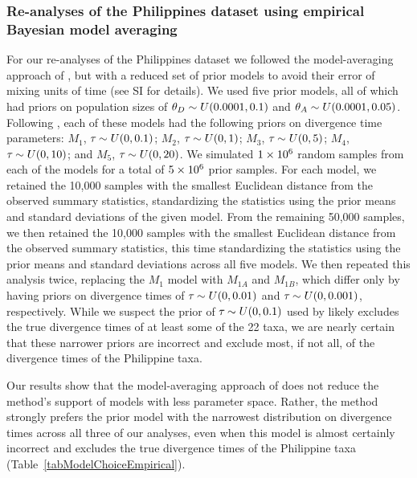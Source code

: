 \subsubsection*{Re-analyses of the Philippines dataset using empirical Bayesian
model averaging}

For our re-analyses of the Philippines dataset we followed the model-averaging
approach of \citet{Hickerson2013}, but with a reduced set of prior models to
avoid their error of mixing units of time (see SI for details).
We used five prior models, all of which had priors on population sizes of
$\meanDescendantTheta{} \sim U(0.0001, 0.1)$ and $\ancestralTheta{} \sim
U(0.0001, 0.05)$.
Following \citet{Hickerson2013}, each of these models had the following
priors on divergence time parameters:
$M_1$, $\tau_{} \sim U(0, 0.1)$;
$M_2$, $\tau_{} \sim U(0, 1)$;
$M_3$, $\tau_{} \sim U(0, 5)$;
$M_4$, $\tau_{} \sim U(0, 10)$; and
$M_5$, $\tau_{} \sim U(0, 20)$.
We simulated $1\times 10^{6}$ random samples from each of the models for a total of
$5\times 10^{6}$ prior samples.
For each model, we retained the 10,000 samples with the smallest Euclidean
distance from the observed summary statistics, standardizing the statistics
using the prior means and standard deviations of the given model.
From the remaining 50,000 samples, we then retained the 10,000 samples with the
smallest Euclidean distance from the observed summary statistics, this time
standardizing the statistics using the prior means and standard deviations
across all five models.
We then repeated this analysis twice, replacing the $M_1$ model with
$M_{1A}$ and $M_{1B}$, which differ only by having priors on divergence
times of $\tau_{} \sim U(0, 0.01)$ and $\tau_{} \sim U(0, 0.001)$,
respectively.
While we suspect the prior of $\tau_{} \sim U(0, 0.1)$ used by
\citet{Hickerson2013} likely excludes the true divergence times of at least
some of the 22 taxa, we are nearly certain that these narrower priors are
incorrect and exclude most, if not all, of the divergence times of the
Philippine taxa.

Our results show that the model-averaging approach of \citet{Hickerson2013}
does not reduce the method's support of models with less parameter space.
Rather, the method strongly prefers the prior model with the narrowest
distribution on divergence times across all three of our analyses, even when
this model is almost certainly incorrect and excludes the true divergence times
of the Philippine taxa (Table~\ref{tabModelChoiceEmpirical}).

